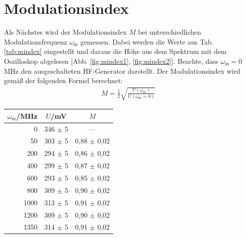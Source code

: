 \newpage
\section{Modulationsindex}
\label{sec:mindex}

Als Nächstes wird der Modulationsindex $M$ bei unterschiedlichen Modulationsfrequenz $\omega_\mathrm{m}$ gemessen. Dabei werden die Werte aus Tab. \ref{tab:mindex} eingestellt und daraus die Höhe aus dem Spektrum mit dem Oszilloskop abgelesen [Abb. \ref{fig:mindex1}, \ref{fig:mindex2}]. Beachte, dass $\omega_\mathrm{m} = 0$\,MHz den ausgeschalteten HF-Generator darstellt. Der Modulationsindex wird gemäß der folgenden Formel berechnet:
\begin{gather}
    M = \frac{1}{2} \sqrt{\frac{U(\omega_\mathrm{m})}{U(\omega_\mathrm{m} = 0)}}
\end{gather}
\begin{center}
    \captionsetup{type=table}
    \begin{tabular}{r | c c}
        $\omega_\mathrm{m}$/MHz & $U$/mV & $M$ \\ \hline
        0    & 346 $\pm$ 5 & --- \\
        50   & 303 $\pm$ 5 & 0,88 $\pm$ 0,02 \\
        200  & 294 $\pm$ 5 & 0,86 $\pm$ 0,02 \\
        400  & 299 $\pm$ 5 & 0,87 $\pm$ 0,02 \\
        600  & 293 $\pm$ 5 & 0,85 $\pm$ 0,02 \\
        800  & 309 $\pm$ 5 & 0,90 $\pm$ 0,02 \\
        1000 & 313 $\pm$ 5 & 0,91 $\pm$ 0,02 \\
        1200 & 309 $\pm$ 5 & 0,90 $\pm$ 0,02 \\
        1350 & 314 $\pm$ 5 & 0,91 $\pm$ 0,02 \\
    \end{tabular}
    \label{tab:mindex}
\end{center}

